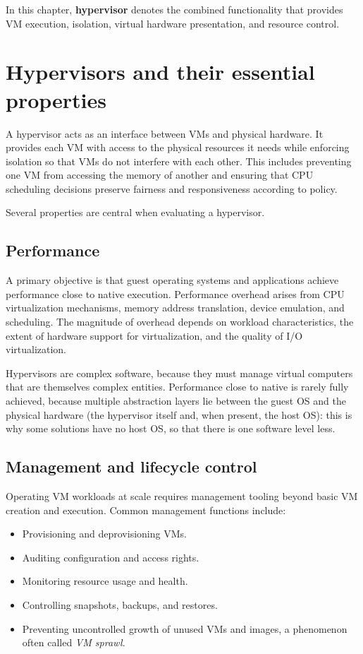 In this chapter, \textbf{hypervisor} denotes the combined functionality that provides VM execution, isolation, virtual hardware presentation, and resource control.

\section{Hypervisors and their essential properties}

A hypervisor acts as an interface between VMs and physical hardware. It provides each VM with access to the physical resources it needs while enforcing isolation so that VMs do not interfere with each other. This includes preventing one VM from accessing the memory of another and ensuring that CPU scheduling decisions preserve fairness and responsiveness according to policy.

Several properties are central when evaluating a hypervisor.

\subsection{Performance}

A primary objective is that guest operating systems and applications achieve performance close to native execution. Performance overhead arises from CPU virtualization mechanisms, memory address translation, device emulation, and scheduling. The magnitude of overhead depends on workload characteristics, the extent of hardware support for virtualization, and the quality of I/O virtualization.

Hypervisors are complex software, because they must manage virtual computers that are themselves complex entities. Performance close to native is rarely fully achieved, because multiple abstraction layers lie between the guest OS and the physical hardware (the hypervisor itself and, when present, the host OS): this is why some solutions have no host OS, so that there is one software level less.

\subsection{Management and lifecycle control}

Operating VM workloads at scale requires management tooling beyond basic VM creation and execution. Common management functions include:

\begin{itemize}
\item Provisioning and deprovisioning VMs.
\item Auditing configuration and access rights.
\item Monitoring resource usage and health.
\item Controlling snapshots, backups, and restores.
\item Preventing uncontrolled growth of unused VMs and images, a phenomenon often called \emph{VM sprawl}.
\end{itemize}

